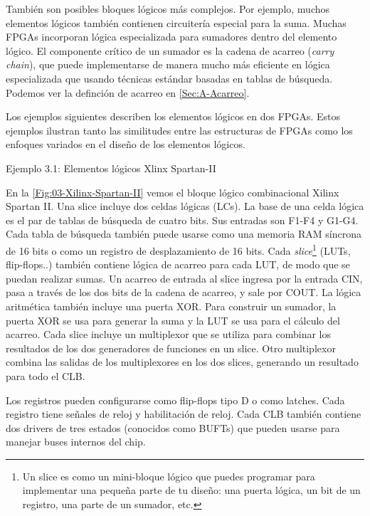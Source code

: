 También son posibles bloques lógicos más complejos. Por ejemplo, muchos elementos lógicos también contienen circuitería especial para la suma. Muchas FPGAs incorporan lógica especializada para sumadores dentro del elemento lógico. El componente crítico de un sumador es la cadena de acarreo (\textit{carry chain}), que puede implementarse de manera mucho más eficiente en lógica especializada que usando técnicas estándar basadas en tablas de búsqueda. Podemos ver la definción de acarreo en \cref{Sec:A-Acarreo}. 

Los ejemplos siguientes describen los elementos lógicos en dos FPGAs. Estos ejemplos ilustran tanto las similitudes entre las estructuras de FPGAs como los enfoques variados en el diseño de los elementos lógicos.


\vspace*{1em}

\begin{Ejemplo}
Ejemplo 3.1: Elementos lógicos Xlinx Spartan-II
\end{Ejemplo}

En la \cref{Fig:03-Xilinx-Spartan-II} vemos el bloque lógico combinacional Xilinx Spartan II. Una slice incluye dos celdas lógicas (LCs). La base de una celda lógica es el par de tablas de búsqueda de cuatro bits. Sus entradas son F1-F4 y G1-G4. Cada tabla de búsqueda también puede usarse como una memoria RAM síncrona de 16 bits o como un registro de desplazamiento de 16 bits. Cada \textit{slice}\footnote{Un slice es como un mini-bloque lógico que puedes programar para implementar una pequeña parte de tu diseño: una puerta lógica, un bit de un registro, una parte de un sumador, etc.}  (LUTs, flip-flops..) también contiene lógica de acarreo para cada LUT, de modo que se puedan realizar sumas. Un acarreo de entrada al slice ingresa por la entrada CIN, pasa a través de los dos bits de la cadena de acarreo, y sale por COUT. La lógica aritmética también incluye una puerta XOR. Para construir un sumador, la puerta XOR se usa para generar la suma y la LUT se usa para el cálculo del acarreo. Cada slice incluye un multiplexor que se utiliza para combinar los resultados de los dos generadores de funciones en un slice. Otro multiplexor combina las salidas de los multiplexores en los dos slices, generando un resultado para todo el CLB.

Los registros pueden configurarse como flip-flops tipo D o como latches. Cada registro tiene señales de reloj y habilitación de reloj. Cada CLB también contiene dos drivers de tres estados (conocidos como BUFTs) que pueden usarse para manejar buses internos del chip.

